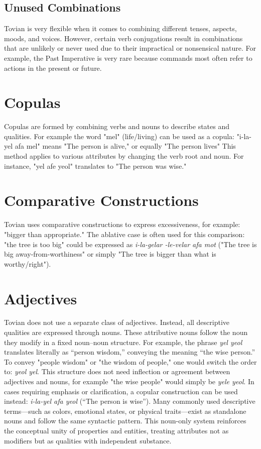 \subsection{Unused Combinations}
Tovian is very flexible when it comes to combining different tenses, aspects, moods, and voices. However, certain verb conjugations result in combinations that are unlikely or never used due to their impractical or nonsensical nature. For example, the Past Imperative is very rare because commands most often refer to actions in the present or future.



\section{Copulas}
Copulas are formed by combining verbs and nouns to describe states and qualities. For example the word "mel" (life/living) can be used as a copula: "i-la-yel afa mel" means "The person is alive," or equally "The person lives" This method applies to various attributes by changing the verb root and noun. For instance, "yel afe yeol" translates to "The person was wise."

 \section{Comparative Constructions}

    Tovian uses comparative constructions to express excessiveness, for example: "bigger than appropriate." The ablative case is often used for this comparison: "the tree is too big" could be expressed as \textit{i-la-gelar \CAabl-le-velar afa mot} ("The tree is big away-from-worthiness" or simply "The tree is bigger than what is worthy/right").

\section{Adjectives}

Tovian does not use a separate class of adjectives. Instead, all descriptive qualities are expressed through nouns. These attributive nouns follow the noun they modify in a fixed noun–noun structure. For example, the phrase \textit{yel yeol} translates literally as “person wisdom,” conveying the meaning “the wise person.” To convey "people wisdom" or "the wisdom of people," one would switch the order to: \textit{yeol yel}. This structure does not need inflection or agreement between adjectives and nouns, for example "the wise people" would simply be \textit{yele yeol}. In cases requiring emphasis or clarification, a copular construction can be used instead: \textit{i-la-yel afa yeol} (“The person is wise”). Many commonly used descriptive terms—such as colors, emotional states, or physical traits—exist as standalone nouns and follow the same syntactic pattern. This noun-only system reinforces the conceptual unity of properties and entities, treating attributes not as modifiers but as qualities with independent substance.



